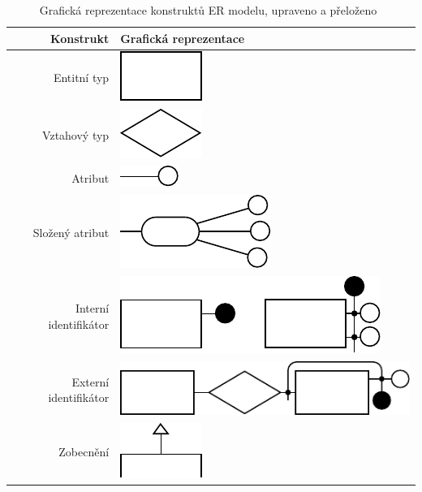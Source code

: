 \begin{table}[!htb]
  \centering
  \begin{tabular}{@{}rm{7cm}@{}} \toprule
    Konstrukt             & Grafická reprezentace                                     \\ \midrule
    Entitní typ           & {\centering\includegraphics{../img/er-model/entity.pdf}}  \\
    Vztahový typ          & \includegraphics{../img/er-model/relationship.pdf}        \\
    Atribut               & \includegraphics{../img/er-model/attribute.pdf}           \\
    Složený atribut       & \includegraphics{../img/er-model/composite-attribute.pdf} \\
    Interní identifikátor & \includegraphics{../img/er-model/identifier.pdf}          \\
    Externí identifikátor & \includegraphics{../img/er-model/external-identifier.pdf} \\
    Zobecnění             & \includegraphics{../img/er-model/generalization.pdf}      \\ \bottomrule
  \end{tabular}
  \caption{Grafická reprezentace konstruktů ER modelu, upraveno a přeloženo~\cite[s.~164]{atzeni_database_1999}}
  \label{tab:er-constructs}
\end{table}

